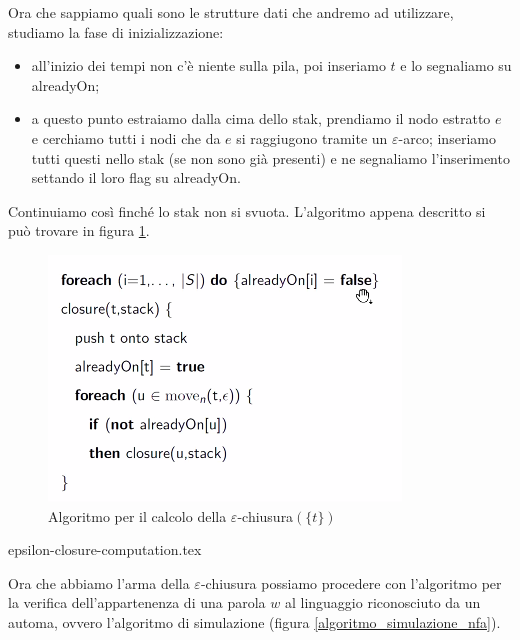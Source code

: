 \documentclass[class=book, crop=false, oneside, 12pt]{standalone}
\begin{document}
Ora che sappiamo quali sono le strutture dati che andremo ad utilizzare, studiamo la fase di inizializzazione: 

\begin{itemize}
    \item all’inizio dei tempi non c’è niente sulla pila, poi inseriamo \(t\) e lo segnaliamo su alreadyOn;
    \item a questo punto estraiamo dalla cima dello stak, prendiamo il nodo estratto \(e\) e cerchiamo tutti i nodi che da \(e\) si raggiugono tramite un \(\varepsilon\)-arco; inseriamo tutti questi nello stak (se non sono già presenti) e ne segnaliamo l'inserimento settando il loro flag su alreadyOn.
\end{itemize}

Continuiamo così finché lo stak non si svuota. L'algoritmo appena descritto si può trovare in figura \ref{algoritmo_epsilon_chiusura}.

\begin{figure}[H]
    \centering
    \includegraphics[width=.6\textwidth,keepaspectratio]{algoritmo_epsilon_chiusura}
    \caption{Algoritmo per il calcolo della \(\varepsilon\)-chiusura\((\{t\})\)}
    \label{algoritmo_epsilon_chiusura}
\end{figure}

	{epsilon-closure-computation.tex}

Ora che abbiamo l'arma della \(\varepsilon\)-chiusura possiamo procedere con l'algoritmo per la verifica dell'appartenenza di una parola \(w\) al linguaggio riconosciuto da un automa, ovvero l'algoritmo di simulazione (figura \ref{algoritmo_simulazione_nfa}).
\end{document}
